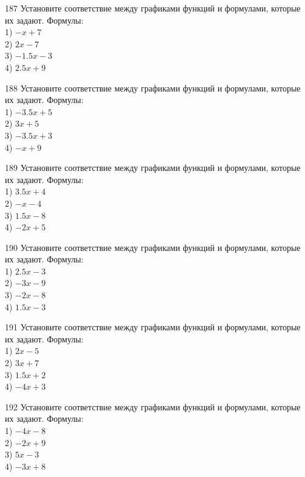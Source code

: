 \documentclass[4apaper]{article}
\begin{document}
\begin{taskBN}{187}
Установите соответствие между графиками функций и формулами, которые их задают. Формулы: \\1) $-x+7$\\2) $2x-7$\\3) $-1.5x-3$\\4) $2.5x+9$
\end{taskBN}

\begin{taskBN}{188}
Установите соответствие между графиками функций и формулами, которые их задают. Формулы: \\1) $-3.5x+5$\\2) $3x+5$\\3) $-3.5x+3$\\4) $-x+9$
\end{taskBN}

\begin{taskBN}{189}
Установите соответствие между графиками функций и формулами, которые их задают. Формулы: \\1) $3.5x+4$\\2) $-x-4$\\3) $1.5x-8$\\4) $-2x+5$
\end{taskBN}

\begin{taskBN}{190}
Установите соответствие между графиками функций и формулами, которые их задают. Формулы: \\1) $2.5x-3$\\2) $-3x-9$\\3) $-2x-8$\\4) $1.5x-3$
\end{taskBN}

\begin{taskBN}{191}
Установите соответствие между графиками функций и формулами, которые их задают. Формулы: \\1) $2x-5$\\2) $3x+7$\\3) $1.5x+2$\\4) $-4x+3$
\end{taskBN}

\begin{taskBN}{192}
Установите соответствие между графиками функций и формулами, которые их задают. Формулы: \\1) $-4x-8$\\2) $-2x+9$\\3) $5x-3$\\4) $-3x+8$
\end{taskBN}
\end{document}
